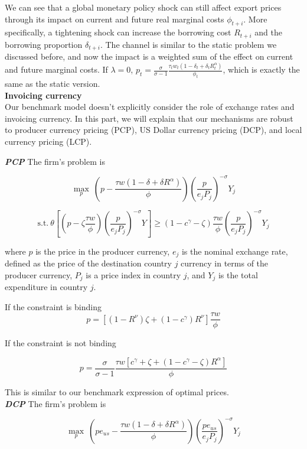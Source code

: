 We can see that a global monetary policy shock can still affect export prices through its impact on current and future real marginal costs $\phi_{t+i}$. More specifically, a tightening shock can increase the borrowing cost $R_{t+i}$ and the borrowing proportion $\delta_{t+i}$. The channel is similar to the static problem we discussed before, and now the impact is a weighted sum of the effect on current and future marginal costs. If $\lambda=0$, $p_t=\frac{\sigma}{\sigma-1}\frac{\tau_{t} w_{t}(1-\delta_{t}+\delta_{t} R_{t}^\alpha)}{\phi_{t}}$, which is exactly the same as the static version. \\






\textbf{Invoicing currency} \\

Our benchmark model doesn't explicitly consider the role of exchange rates and invoicing currency. In this part, we will explain that our mechanisms are robust to producer currency pricing (PCP), US Dollar currency pricing (DCP), and local currency pricing (LCP). 

\textbf{\textit{PCP}} The firm's problem is 

$$
\max_{p} \ (p- \frac{\tau w(1-\delta+\delta R^\alpha)}{\phi}) (\frac{p}{e_jP_j})^{-\sigma} Y_j
$$

$$
\text{s.t.} \ \theta [(p-\zeta \frac{\tau w}{\phi}) (\frac{p}{e_jP_j})^{-\sigma} Y]\geq(1-c^\gamma-\zeta)\frac{\tau w}{\phi} (\frac{p}{e_jP_j})^{-\sigma} Y_j
$$

where $p$ is the price in the producer currency, $e_j$ is the nominal exchange rate, defined as the price of the destination country $j$ currency in terms of the producer currency, $P_j$ is a price index in country $j$, and $Y_j$ is the total expenditure in country $j$.

If the constraint is binding
$$
p=[(1-R^{\nu})\zeta+(1-c^\gamma)R^{\nu}] \frac{\tau w}{\phi}
$$

If the constraint is not binding

$$
p=\frac{\sigma}{\sigma-1}\frac{\tau w [c^\gamma+\zeta+(1-c^\gamma-\zeta) R^\alpha]}{\phi}
$$

This is similar to our benchmark expression of optimal prices. \\

\textbf{\textit{DCP}} The firm's problem is   

$$
\max_{p} \ (pe_{us}- \frac{\tau w(1-\delta+\delta R^\alpha)}{\phi}) (\frac{pe_{us}}{e_jP_j})^{-\sigma} Y_j
$$

